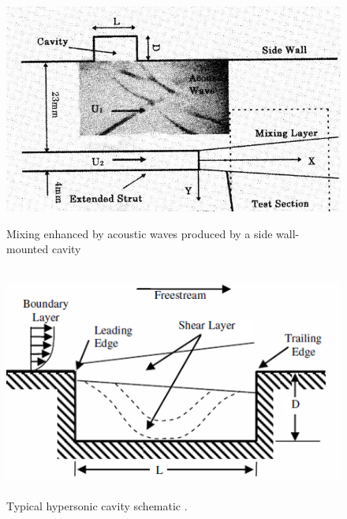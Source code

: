 \begin{figure}
\centering
\includegraphics[height=3in]{Figures/CavMix.jpg}
\caption[Cavity-Actuated Mixing]{Mixing enhanced by acoustic waves produced by a side wall-mounted cavity \cite{sato1999advanced}}
\label{fig:sato}
\end{figure}

\begin{figure}
\centering
\includegraphics[height=3in]{Figures/CavityDiagram.png}
\caption[Diagram of typical cavity]{Typical hypersonic cavity schematic \cite{lazar2008control}.}
\end{figure}

